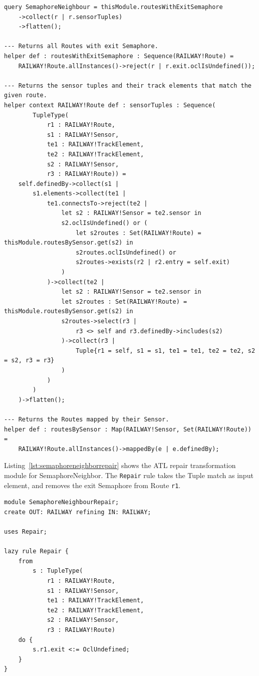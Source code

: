\documentclass[submission,copyright,creativecommons]{eptcs}
\begin{document}
\lstset{language=atl}
\begin{lstlisting}[float=htb, caption={SemaphoreNeighbor query in ATL}, label=lst:semaphoreneighbor, captionpos=b, frame=tb, belowskip=-10pt]
query SemaphoreNeighbour = thisModule.routesWithExitSemaphore
	->collect(r | r.sensorTuples)
	->flatten();

--- Returns all Routes with exit Semaphore.
helper def : routesWithExitSemaphore : Sequence(RAILWAY!Route) =
	RAILWAY!Route.allInstances()->reject(r | r.exit.oclIsUndefined());

--- Returns the sensor tuples and their track elements that match the given route.
helper context RAILWAY!Route def : sensorTuples : Sequence(
		TupleType(
			r1 : RAILWAY!Route,
			s1 : RAILWAY!Sensor, 
			te1 : RAILWAY!TrackElement, 
			te2 : RAILWAY!TrackElement, 
			s2 : RAILWAY!Sensor,
			r3 : RAILWAY!Route)) =
	self.definedBy->collect(s1 | 
		s1.elements->collect(te1 | 
			te1.connectsTo->reject(te2 | 
				let s2 : RAILWAY!Sensor = te2.sensor in
				s2.oclIsUndefined() or (
					let s2routes : Set(RAILWAY!Route) = thisModule.routesBySensor.get(s2) in
					s2routes.oclIsUndefined() or
					s2routes->exists(r2 | r2.entry = self.exit)
				)
			)->collect(te2 |
				let s2 : RAILWAY!Sensor = te2.sensor in
				let s2routes : Set(RAILWAY!Route) = thisModule.routesBySensor.get(s2) in
				s2routes->select(r3 |
					r3 <> self and r3.definedBy->includes(s2)
				)->collect(r3 |
					Tuple{r1 = self, s1 = s1, te1 = te1, te2 = te2, s2 = s2, r3 = r3}
				)
			)
		)
	)->flatten();

--- Returns the Routes mapped by their Sensor.
helper def : routesBySensor : Map(RAILWAY!Sensor, Set(RAILWAY!Route)) =
	RAILWAY!Route.allInstances()->mappedBy(e | e.definedBy);
\end{lstlisting}

Listing~\ref{lst:semaphoreneighborrepair} shows the ATL repair transformation module for SemaphoreNeighbor. The \texttt{Repair} rule takes the Tuple match as input element, and removes the exit Semaphore from Route \texttt{r1}.

\lstset{language=atl}
\begin{lstlisting}[float=htb, caption={SemaphoreNeighbor repair transformation module in ATL}, label=lst:semaphoreneighborrepair, captionpos=b, frame=tb, belowskip=-10pt]
module SemaphoreNeighbourRepair;
create OUT: RAILWAY refining IN: RAILWAY;

uses Repair;

lazy rule Repair {
	from
		s : TupleType(
			r1 : RAILWAY!Route,
			s1 : RAILWAY!Sensor, 
			te1 : RAILWAY!TrackElement, 
			te2 : RAILWAY!TrackElement, 
			s2 : RAILWAY!Sensor,
			r3 : RAILWAY!Route)
	do {
		s.r1.exit <:= OclUndefined;
	}
}
\end{lstlisting}
\end{document}
